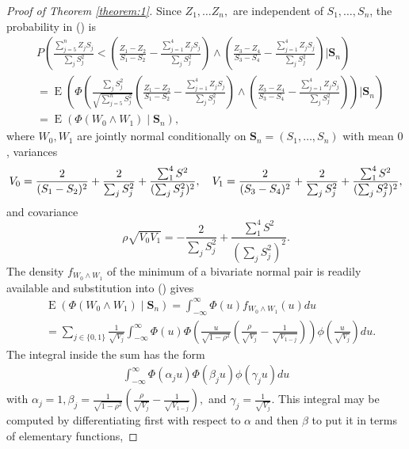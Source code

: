 \documentclass[12pt]{article}
\renewcommand{\P}{P}
\newcommand{\z}{Z}
\newcommand{\s}{S}
\newcommand{\w}{W}
\newcommand{\svec}{\vec{S}}
\renewcommand{\vec}[1]{\textbf{#1}}
\DeclareMathOperator{\E}{E}
\begin{document}
\begin{proof}[Proof of Theorem \ref{theorem:1}]
    Since $\z_1,\ldots\z_n,$ are independent of $\s_1,\ldots,\s_n$, the probability in () is
    \begin{align}
      &\P\left(\frac{\sum_{j=5}^n \z_j\s_j}{\sum_j \s_j^2} < \left(\frac{\z_1-\z_2}{\s_1-\s_2}- \frac{\sum_{j=1}^4\z_j\s_j}{\sum_j\s_j^2}  \right)\wedge \left(\frac{\z_3-\z_4}{\s_3-\s_4}- \frac{\sum_{j=1}^4\z_j\s_j}{\sum_j\s_j^2}\right) \bigg\vert \svec_n\right)\\
      &=\E\left(\Phi\left(\frac{\sum_j\s_j^2}{\sqrt{\sum_{j=5}^n\s_j^2}}\left(\frac{\z_1-\z_2}{\s_1-\s_2}- \frac{\sum_{j=1}^4\z_j\s_j}{\sum_j\s_j^2}  \right)\wedge \left(\frac{\z_3-\z_4}{\s_3-\s_4}- \frac{\sum_{j=1}^4\z_j\s_j}{\sum_j\s_j^2}\right)  \right) \bigg\vert \svec_n\right)\\
      &=\E\left(\Phi(\w_0\wedge \w_1)\mid \svec_n\right),\label{thm1:min_exp}
    \end{align}
    where $\w_0,\w_1$ are jointly normal conditionally on $\vec{\s}_n=(\s_1,\ldots,\s_n)$ with mean $0$, variances
    $$
    V_0=\frac{2}{(\s_1-\s_2)^2} + \frac{2}{\sum_j\s_j^2}+\frac{\sum_{1}^4\s^2}{(\sum_j\s_j^2)^2}, \hspace{10px}    V_1=\frac{2}{(\s_3-\s_4)^2} + \frac{2}{\sum_j\s_j^2}+\frac{\sum_{1}^4\s^2}{(\sum_j\s_j^2)^2},
    $$
    and covariance
    $$
    \rho\sqrt{V_0V_1}=-\frac{2}{\sum_j\s_j^2}+\frac{\sum_{1}^4\s^2}{(\sum_j\s_j^2)^2}.
    $$
    The density $f_{\w_0\wedge \w_1}$ of the minimum of a bivariate normal pair is readily available and substitution into () gives
    \begin{align}
      &\E\left(\Phi(\w_0\wedge \w_1)\mid \vec{\s}_n\right) = \int_{-\infty}^{\infty}\Phi(u)f_{\w_0\wedge \w_1}(u)du\\
      &=\sum_{j\in\{0,1\}}\frac{1}{\sqrt{V_j}}\int_{-\infty}^{\infty}\Phi(u)\Phi\left(\frac{u}{\sqrt{1-\rho^2}}\left(\frac{\rho}{\sqrt{V_j}}-\frac{1}{\sqrt{V_{1-j}}}\right) \right)\phi\left(\frac{u}{\sqrt{V_j}}\right)du.
    \end{align}
    The integral inside the sum has the form
    \begin{align}
      \int_{-\infty}^{\infty}\Phi(\alpha_j u)\Phi(\beta_j u)\phi(\gamma_j u)du
    \end{align}
    with $\alpha_j=1,\beta_j=\frac{1}{\sqrt{1-\rho^2}}\left(\frac{\rho}{\sqrt{V_j}}-\frac{1}{\sqrt{V_{1-j}}}\right),$ and $\gamma_j = \frac{1}{\sqrt{V_j}}$. This integral may be computed by differentiating first with respect to $\alpha$ and then $\beta$ to put it in terms of elementary functions,

\end{proof}
\end{document}
